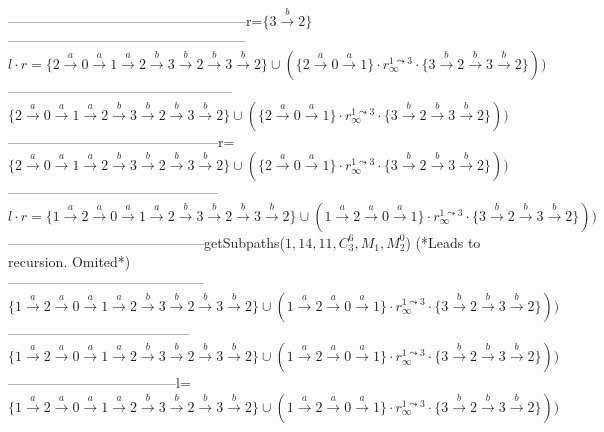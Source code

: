 {---------------------------------------------------r=$\{3 \xrightarrow{b} 2\}$\\
---------------------------------------------------$l \cdot r =\{2 \xrightarrow{a} 0 \xrightarrow{a} 1 \xrightarrow{a} 2 \xrightarrow{b} 3 \xrightarrow{b} 2 \xrightarrow{b} 3 \xrightarrow{b} 2\} \cup (\{2 \xrightarrow{a} 0 \xrightarrow{a} 1\} \cdot r_\infty^{1\leadsto 3} \cdot \{3 \xrightarrow{b} 2 \xrightarrow{b} 3 \xrightarrow{b} 2\}))$\\
------------------------------------------------$\{2 \xrightarrow{a} 0 \xrightarrow{a} 1 \xrightarrow{a} 2 \xrightarrow{b} 3 \xrightarrow{b} 2 \xrightarrow{b} 3 \xrightarrow{b} 2\} \cup (\{2 \xrightarrow{a} 0 \xrightarrow{a} 1\} \cdot r_\infty^{1\leadsto 3} \cdot \{3 \xrightarrow{b} 2 \xrightarrow{b} 3 \xrightarrow{b} 2\}))$\\
---------------------------------------------r=$\{2 \xrightarrow{a} 0 \xrightarrow{a} 1 \xrightarrow{a} 2 \xrightarrow{b} 3 \xrightarrow{b} 2 \xrightarrow{b} 3 \xrightarrow{b} 2\} \cup (\{2 \xrightarrow{a} 0 \xrightarrow{a} 1\} \cdot r_\infty^{1\leadsto 3} \cdot \{3 \xrightarrow{b} 2 \xrightarrow{b} 3 \xrightarrow{b} 2\}))$\\
---------------------------------------------$l\cdot r = \{1 \xrightarrow{a} 2 \xrightarrow{a} 0 \xrightarrow{a} 1 \xrightarrow{a} 2 \xrightarrow{b} 3 \xrightarrow{b} 2 \xrightarrow{b} 3 \xrightarrow{b} 2\} \cup (1 \xrightarrow{a} 2 \xrightarrow{a} 0 \xrightarrow{a} 1\} \cdot r_\infty^{1\leadsto 3} \cdot \{3 \xrightarrow{b} 2 \xrightarrow{b} 3 \xrightarrow{b} 2\}))$\\
------------------------------------------getSubpaths($1,14,11,C_3^6,M_1,M_2^0$) (*Leads to recursion. Omited*)\\
------------------------------------------$\{1 \xrightarrow{a} 2 \xrightarrow{a} 0 \xrightarrow{a} 1 \xrightarrow{a} 2 \xrightarrow{b} 3 \xrightarrow{b} 2 \xrightarrow{b} 3 \xrightarrow{b} 2\} \cup (1 \xrightarrow{a} 2 \xrightarrow{a} 0 \xrightarrow{a} 1\} \cdot r_\infty^{1\leadsto 3} \cdot \{3 \xrightarrow{b} 2 \xrightarrow{b} 3 \xrightarrow{b} 2\}))$\\
---------------------------------------$\{1 \xrightarrow{a} 2 \xrightarrow{a} 0 \xrightarrow{a} 1 \xrightarrow{a} 2 \xrightarrow{b} 3 \xrightarrow{b} 2 \xrightarrow{b} 3 \xrightarrow{b} 2\} \cup (1 \xrightarrow{a} 2 \xrightarrow{a} 0 \xrightarrow{a} 1\} \cdot r_\infty^{1\leadsto 3} \cdot \{3 \xrightarrow{b} 2 \xrightarrow{b} 3 \xrightarrow{b} 2\}))$\\
------------------------------------l=$\{1 \xrightarrow{a} 2 \xrightarrow{a} 0 \xrightarrow{a} 1 \xrightarrow{a} 2 \xrightarrow{b} 3 \xrightarrow{b} 2 \xrightarrow{b} 3 \xrightarrow{b} 2\} \cup (1 \xrightarrow{a} 2 \xrightarrow{a} 0 \xrightarrow{a} 1\} \cdot r_\infty^{1\leadsto 3} \cdot \{3 \xrightarrow{b} 2 \xrightarrow{b} 3 \xrightarrow{b} 2\}))$\\
}
